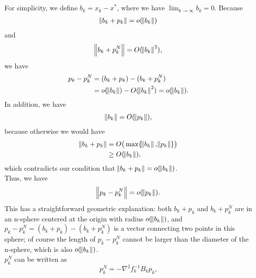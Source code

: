 \documentclass[11pt]{article}
\begin{document}
\maketitle
\section{}
For simplicity, we define $b_k = x_k - x^*$, where we have $\lim_{k\to\infty}b_k=0$. Because
\begin{equation}\begin{split}
\norm{b_k+p_k} = o(\norm{b_k})
\end{split}\nonumber\end{equation} 
and 
\begin{equation}\begin{split}
\norm{b_k+p_k^N} = O(\norm{b_k}^2),
\end{split}\nonumber\end{equation}
we have 
\begin{equation}\begin{split}
p_k-p_k^N &= (b_k+p_k) - (b_k+p_k^N) \\
&= o(\norm{b_k}) - O(\norm{b_k}^2) = o(\norm{b_k}).
\end{split}\nonumber\end{equation} 
In addition, we have
$$\norm{b_k} = O(\norm{p_k}),$$
because otherwise we would have 
\begin{equation}\begin{split} 
\norm{b_k+p_k} &= O\big(\max\{\norm{b_k},\norm{p_k}\}\big) \\
&\geq O(\norm{b_k}), 
\end{split}\nonumber\end{equation} 
which contradicts our condition that $\norm{b_k+p_k} = o(\norm{b_k})$.\\
Thus, we have
\begin{equation}\begin{split}
\norm{p_k-p_k^N} = o(\norm{p_k}).
\end{split}\nonumber\end{equation} 
This has a straightforward geometric explanation: both $b_k+p_k$ and $b_k+ p_k^N$ are in an n-sphere centered at the origin with radius $o(\norm{b_k})$, and $p_k-p_k^N = (b_k+p_k) - (b_k+p_k^N)$ is a vector connecting two points in this sphere; of course the length of $p_k-p_k^N$ cannot be larger than the diameter of the n-sphere, which is also $o(\norm{b_k})$. \\[0.3cm]
$p_k^N$ can be written as $$p_k^N = -\nabla^2f_k^{-1}B_kp_k,$$
\end{document}
